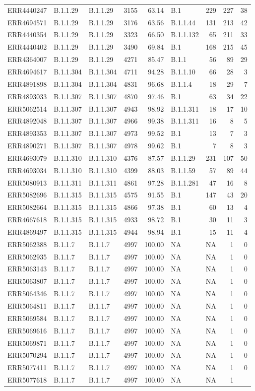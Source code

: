 \documentclass[
]{article}
\begin{document}
\begin{longtable}[]{@{}lllrrlrrr@{}}
ERR4440247 & B.1.1.29 & B.1.1.29 & 3155 & 63.14 & B.1 & 229 & 227 &
38\tabularnewline
ERR4694571 & B.1.1.29 & B.1.1.29 & 3176 & 63.56 & B.1.1.44 & 131 & 213 &
42\tabularnewline
ERR4440354 & B.1.1.29 & B.1.1.29 & 3323 & 66.50 & B.1.1.132 & 65 & 211 &
33\tabularnewline
ERR4440402 & B.1.1.29 & B.1.1.29 & 3490 & 69.84 & B.1 & 168 & 215 &
45\tabularnewline
ERR4364007 & B.1.1.29 & B.1.1.29 & 4271 & 85.47 & B.1.1 & 56 & 89 &
29\tabularnewline
ERR4694617 & B.1.1.304 & B.1.1.304 & 4711 & 94.28 & B.1.1.10 & 66 & 28 &
3\tabularnewline
ERR4891898 & B.1.1.304 & B.1.1.304 & 4831 & 96.68 & B.1.1.4 & 18 & 29 &
7\tabularnewline
ERR4893033 & B.1.1.307 & B.1.1.307 & 4870 & 97.46 & B.1 & 63 & 34 &
22\tabularnewline
ERR5062514 & B.1.1.307 & B.1.1.307 & 4943 & 98.92 & B.1.1.311 & 18 & 17
& 10\tabularnewline
ERR4892048 & B.1.1.307 & B.1.1.307 & 4966 & 99.38 & B.1.1.311 & 16 & 8 &
5\tabularnewline
ERR4893353 & B.1.1.307 & B.1.1.307 & 4973 & 99.52 & B.1 & 13 & 7 &
3\tabularnewline
ERR4890271 & B.1.1.307 & B.1.1.307 & 4978 & 99.62 & B.1 & 7 & 8 &
3\tabularnewline
ERR4693079 & B.1.1.310 & B.1.1.310 & 4376 & 87.57 & B.1.1.29 & 231 & 107
& 50\tabularnewline
ERR4693034 & B.1.1.310 & B.1.1.310 & 4399 & 88.03 & B.1.1.59 & 57 & 89 &
44\tabularnewline
ERR5080913 & B.1.1.311 & B.1.1.311 & 4861 & 97.28 & B.1.1.281 & 47 & 16
& 8\tabularnewline
ERR5082696 & B.1.1.315 & B.1.1.315 & 4575 & 91.55 & B.1 & 147 & 43 &
20\tabularnewline
ERR5082664 & B.1.1.315 & B.1.1.315 & 4866 & 97.38 & B.1 & 60 & 13 &
4\tabularnewline
ERR4667618 & B.1.1.315 & B.1.1.315 & 4933 & 98.72 & B.1 & 30 & 11 &
3\tabularnewline
ERR4869497 & B.1.1.315 & B.1.1.315 & 4944 & 98.94 & B.1 & 15 & 11 &
4\tabularnewline
ERR5062388 & B.1.1.7 & B.1.1.7 & 4997 & 100.00 & NA & NA & 1 &
0\tabularnewline
ERR5062935 & B.1.1.7 & B.1.1.7 & 4997 & 100.00 & NA & NA & 1 &
0\tabularnewline
ERR5063143 & B.1.1.7 & B.1.1.7 & 4997 & 100.00 & NA & NA & 1 &
0\tabularnewline
ERR5063807 & B.1.1.7 & B.1.1.7 & 4997 & 100.00 & NA & NA & 1 &
0\tabularnewline
ERR5064346 & B.1.1.7 & B.1.1.7 & 4997 & 100.00 & NA & NA & 1 &
0\tabularnewline
ERR5064811 & B.1.1.7 & B.1.1.7 & 4997 & 100.00 & NA & NA & 1 &
0\tabularnewline
ERR5069584 & B.1.1.7 & B.1.1.7 & 4997 & 100.00 & NA & NA & 1 &
0\tabularnewline
ERR5069616 & B.1.1.7 & B.1.1.7 & 4997 & 100.00 & NA & NA & 1 &
0\tabularnewline
ERR5069871 & B.1.1.7 & B.1.1.7 & 4997 & 100.00 & NA & NA & 1 &
0\tabularnewline
ERR5070294 & B.1.1.7 & B.1.1.7 & 4997 & 100.00 & NA & NA & 1 &
0\tabularnewline
ERR5077411 & B.1.1.7 & B.1.1.7 & 4997 & 100.00 & NA & NA & 1 &
0\tabularnewline
ERR5077618 & B.1.1.7 & B.1.1.7 & 4997 & 100.00 & NA & NA & 1 &

\end{longtable}
\end{document}
